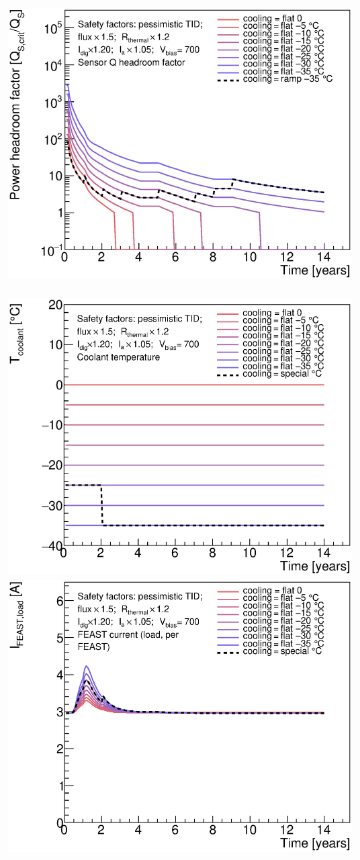 \begin{figure}[ht!]
\begin{subfigure}[t]{0.50\textwidth}
\begin{center}
\includegraphics[width=0.74\linewidth]{figures/studies/SensorQHeadroom_CompareR1_Ramp.eps}
\end{center}
\end{subfigure}
\begin{subfigure}[t]{0.50\textwidth}
\begin{center}
\includegraphics[width=0.74\linewidth]{figures/studies/CoolantTemperature_CompareR1_Proposal.eps}
\includegraphics[width=0.74\linewidth]{figures/studies/FeastCurrent_CompareR1_Proposal.eps}

\end{center}
\end{subfigure}
\end{figure}
